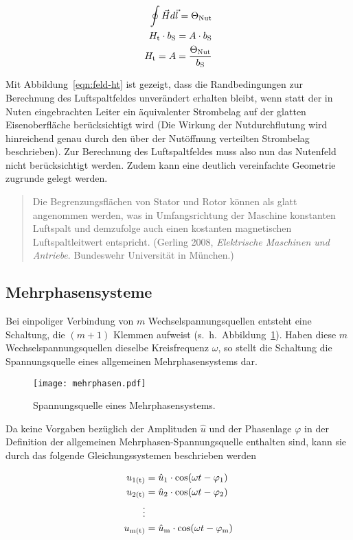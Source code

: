 \begin{align}
\oint \vec{H}d\vec{l} = \Theta_{\mathrm{Nut}} \\
H_{\mathrm{t}}\cdot b_{\mathrm{S}} = A\cdot b_{\mathrm{S}} \\
H_{\mathrm{t}} = A = \frac{\Theta_{\mathrm{Nut}}}{b_{\mathrm{S}}} \label{eqn:feld-ht}
\end{align}

Mit Abbildung~\ref{eqn:feld-ht} ist gezeigt, dass die Randbedingungen zur Berechnung des Luftspaltfeldes unverändert erhalten bleibt, wenn statt der in Nuten eingebrachten Leiter ein äquivalenter Strombelag auf der glatten Eisenoberfläche berücksichtigt wird (Die Wirkung der Nutdurchflutung wird hinreichend genau durch den über der Nutöffnung verteilten Strombelag beschrieben).
Zur Berechnung des Luftspaltfeldes muss also nun das Nutenfeld nicht berücksichtigt werden.
Zudem kann eine deutlich vereinfachte Geometrie zugrunde gelegt werden.

\begin{quote}
Die Begrenzungsflächen von Stator und Rotor können als glatt angenommen werden, was in Umfangsrichtung der Maschine konstanten Luftspalt und demzufolge auch einen kostanten magnetischen Luftspaltleitwert entspricht. (Gerling 2008, \emph{Elektrische Maschinen und Antriebe}. Bundeswehr Universität in München.)
\end{quote}

\subsection{Mehrphasensysteme}

Bei einpoliger Verbindung von $m$ Wechselspannungsquellen entsteht eine Schaltung, die $(m+1)$ Klemmen aufweist (s.~h.~Abbildung~\ref{fig:mehrphasen}).
Haben diese $m$ Wechselspannungsquellen dieselbe Kreisfrequenz $\omega$, so stellt die Schaltung die Spannungsquelle eines allgemeinen Mehrphasensystems dar.

\begin{figure}[!h]
\centering
\texttt{[image: mehrphasen.pdf]}
\label{fig:mehrphasen}
\caption{Spannungsquelle eines Mehrphasensystems.}
\end{figure}

Da keine Vorgaben bezüglich der Amplituden $\hat{u}$ und der Phasenlage $\varphi$ in der Definition der allgemeinen Mehrphasen-Spannungsquelle enthalten sind, kann sie \zB durch das folgende Gleichungssystemen beschrieben werden

\begin{align}
u_{\mathrm{1(t)}} &= \hat{u}_{\mathrm{1}} \cdot \cos(\omega t - \varphi_{\mathrm{1}}) \\
u_{\mathrm{2(t)}} &= \hat{u}_{\mathrm{2}} \cdot \cos(\omega t - \varphi_{\mathrm{2}}) \nonumber  \\
\vdots \nonumber \\
u_{\mathrm{m(t)}} &= \hat{u}_{\mathrm{m}} \cdot \cos(\omega t - \varphi_{\mathrm{m}}) \nonumber
\end{align}

